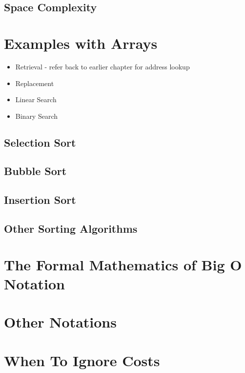 \subsection{Space Complexity}

\section{Examples with Arrays}

\begin{itemize}
	
	\item Retrieval  - refer back to earlier chapter for address lookup 
	\item Replacement
	\item Linear Search
	\item Binary Search
\end{itemize}



\subsection{Selection Sort}



\subsection{Bubble Sort}
\subsection{Insertion Sort}
\subsection{Other Sorting Algorithms}


\section{The Formal Mathematics of Big O Notation}
\section{Other Notations}


\section{When To Ignore Costs}